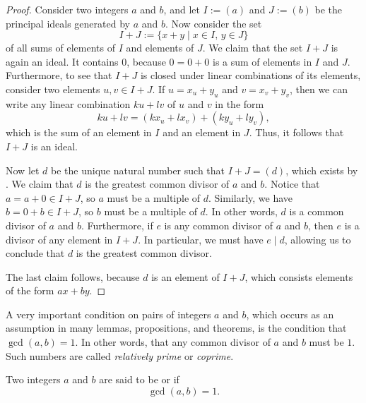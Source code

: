 \begin{proof}
  Consider two integers $a$ and $b$, and let $I:=(a)$ and $J:=(b)$ be the principal ideals generated by $a$ and $b$. Now consider the set
  \begin{equation*}
    I+J := \{x+y \mid x\in I,\,y\in J\}
  \end{equation*}
  of all sums of elements of $I$ and elements of $J$. We claim that the set $I+J$ is again an ideal. It contains $0$, because $0=0+0$ is a sum of elements in $I$ and $J$. Furthermore, to see that $I+J$ is closed under linear combinations of its elements, consider two elements $u,v\in I+J$. If $u=x_u+y_u$ and $v=x_v+y_v$, then we can write any linear combination $ku+lv$ of $u$ and $v$ in the form
  \begin{equation*}
    ku+lv = (kx_u + lx_v) + (ky_u + ly_v),
  \end{equation*}
  which is the sum of an element in $I$ and an element in $J$. Thus, it follows that $I+J$ is an ideal.

  Now let $d$ be the unique natural number such that $I+J=(d)$, which exists by . We claim that $d$ is the greatest common divisor of $a$ and $b$. Notice that $a=a+0\in I+J$, so $a$ must be a multiple of $d$. Similarly, we have $b=0+b\in I+J$, so $b$ must be a multiple of $d$. In other words, $d$ is a common divisor of $a$ and $b$. Furthermore, if $e$ is any common divisor of $a$ and $b$, then $e$ is a divisor of any element in $I+J$. In particular, we must have $e\mid d$, allowing us to conclude that $d$ is the greatest common divisor.

  The last claim follows, because $d$ is an element of $I+J$, which consists elements of the form $ax+by$.
\end{proof}

A very important condition on pairs of integers $a$ and $b$, which occurs as an assumption in many lemmas, propositions, and theorems, is the condition that $\gcd(a,b)=1$. In other words, that any common divisor of $a$ and $b$ must be $1$. Such numbers are called \emph{relatively prime} or \emph{coprime}.

\begin{definition}
  Two integers $a$ and $b$ are said to be  or  if
  \begin{equation*}
    \gcd(a,b)=1.
  \end{equation*}
\end{definition}

